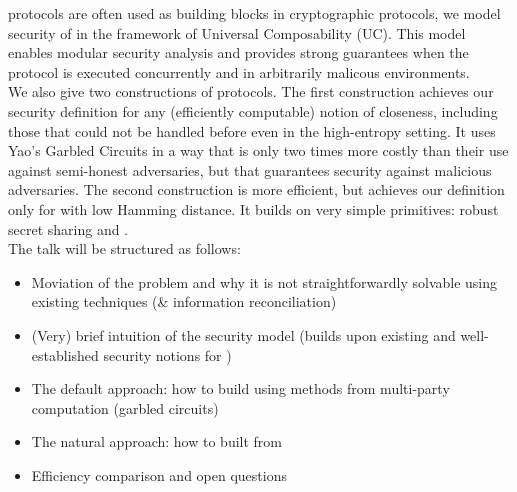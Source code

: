 \documentclass[envcountsame,runningheads]{llncs}
\begin{document}
protocols are often used as building blocks in cryptographic protocols, we model security of \FAKE in the framework of Universal Composability (UC). This model 
enables modular security analysis and provides strong guarantees when the \FAKE protocol is executed concurrently and in arbitrarily malicous environments.\\
We also give two constructions of \FAKE protocols. 
The first construction achieves our \FAKE security definition for any (efficiently computable) notion of closeness, including those that could not be handled before even in the high-entropy setting.
It uses Yao's Garbled Circuits in a way that is only two times more costly than their use against semi-honest adversaries, but that guarantees security against malicious adversaries.
The second construction is more efficient, but achieves our \FAKE definition only for \passwords with low Hamming distance.
It builds on very simple primitives: robust secret sharing and \PAKE.\\

The talk will be structured as follows:
\begin{itemize}
 \item Moviation of the problem and why it is not straightforwardly solvable using existing techniques (\PAKE \& information reconciliation)
 \item (Very) brief intuition of the security model (builds upon existing and well-established security notions for \PAKE)
 \item The default approach: how to build \FAKE using methods from multi-party computation (garbled circuits)
 \item The natural approach: how to built \FAKE from \PAKE
 \item Efficiency comparison and open questions
\end{itemize}
\end{document}
